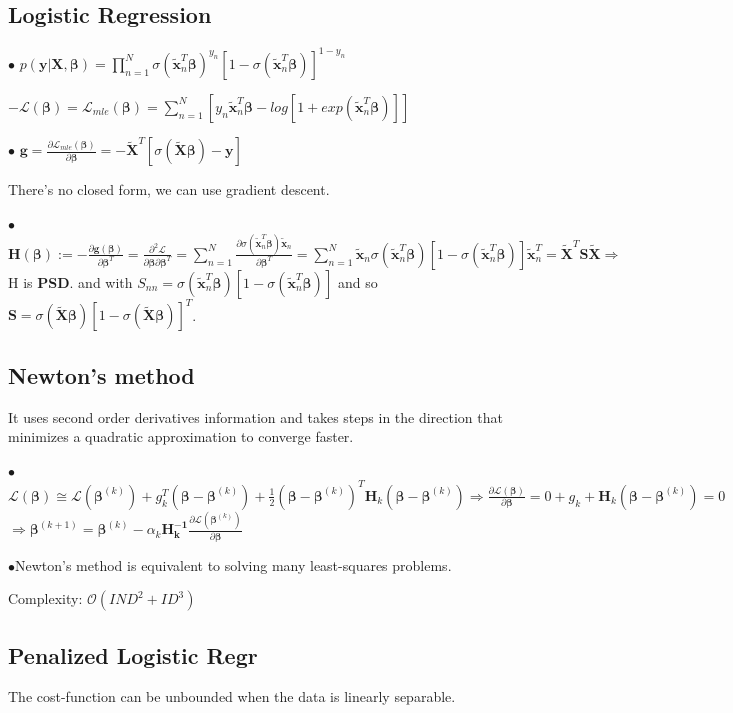 \documentclass[10pt,a4paper,landscape]{article}
\renewcommand{\bf}[1]{\ensuremath{\mathbf{#1}}}
\newcommand{\bbeta}{\boldsymbol\beta}
\begin{document}
\begin{multicols*}{6}
\subsection{Logistic Regression}
$\bullet$ $p(\bf{y}|\bf{X},\bbeta)=\prod_{n=1}^N \sigma(\tilde{\bf{x}}_n^T\bbeta)^{y_n}[1-\sigma(\tilde{\bf{x}}_n^T\bbeta)]^{1-y_n}$

$-\mathcal{L}(\bbeta)=\mathcal{L}_{mle}(\bbeta)=\sum_{n=1}^N[y_n\tilde{\bf{x}}_n^T\bbeta-log[1+exp(\tilde{\bf{x}}_n^T\bbeta)]]$

$\bullet$ $\bf{g}=\frac{ \partial\mathcal{L}_{mle}(\bbeta) }{ \partial \bbeta } =- \tilde{\bf{X}}^T [\sigma(\tilde{\bf{X}} \bbeta) - \bf{y}]$

There's no closed form, we can use gradient descent.

$\bullet$ $\bf{H}(\bbeta) := -\frac{\partial \bf{g}(\bbeta)}{\partial \bbeta^T} 
= \frac{\partial^2 \bf{\mathcal{L}}}{\partial\bbeta\partial\bbeta^T}   
=\sum_{n=1}^N\frac{\partial\sigma(\tilde{\bf{x}}_n^T\bbeta) \tilde{\bf{x}}_n}{\partial \bbeta^T}
=\sum_{n=1}^N\tilde{\bf{x}}_n  \sigma(\tilde{\bf{x}}_n^T\bbeta)[1-\sigma(\tilde{\bf{x}}_n^T\bbeta)]    \tilde{\bf{x}}_n^T
=\tilde{\bf{X}}^T\bf{S}\tilde{\bf{X}} \Rightarrow$ H is \textbf{PSD}.
and with $S_{nn}=\sigma(\tilde{\bf{x}}_n^T\bbeta)[1-\sigma(\tilde{\bf{x}}_n^T\bbeta)]$
and so $\bf{S}=\sigma(\tilde{\bf{X}}\bbeta)[1-\sigma(\tilde{\bf{X}}\bbeta)]^T$.

\subsection{Newton's method}
It uses second order derivatives information and takes steps in the direction that minimizes a quadratic approximation to converge faster.

$\bullet$ $\bf{\mathcal{L}}(\bbeta) \cong \bf{\mathcal{L}}(\bbeta^{(k)})  + g_k^T(\bbeta-\bbeta^{(k)})  + \frac{1}{2}(\bbeta-\bbeta^{(k)})^T\bf{H}_k(\bbeta-\bbeta^{(k)})\Rightarrow  \frac{ \partial\mathcal{L}(\bbeta) }{ \partial \bbeta }=0+g_k+\bf{H}_k(\bbeta-\bbeta^{(k)})=0$
 $\Rightarrow\bbeta^{(k+1)} = \bbeta^{(k)} - \alpha_k \bf{H_k^{-1}} \frac{\partial \mathcal{L}(\bbeta^{(k)})}{\partial \bbeta}$

$\bullet$Newton's method is equivalent to solving many least-squares problems.

Complexity: $\mathcal{O}(I N D^2 + I D^3)$

\subsection{Penalized Logistic Regr}
The cost-function can be unbounded when the data is linearly separable. 


\end{multicols*}
\end{document}

